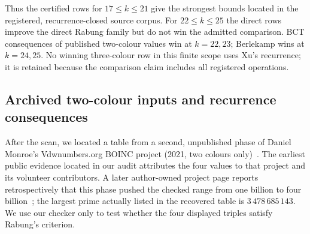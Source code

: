 


Thus the certified rows for $17\le k\le21$ give the strongest bounds located
in the registered, recurrence-closed source corpus. For $22\le k\le25$ the
direct rows improve the direct Rabung family but do not win the admitted
comparison. BCT consequences of published two-colour values win at $k=22,23$;
Berlekamp wins at $k=24,25$. No winning three-colour row in this finite scope
uses Xu's recurrence; it is retained because the comparison claim includes all
registered operations.

\subsection{Archived two-colour inputs and recurrence consequences}\label{ss:r2}

After the scan, we located a table from a second, unpublished phase of Daniel
Monroe's Vdwnumbers.org BOINC project (2021, two colours only)~\cite{MonroePhase2Archive}.
The earliest public evidence located in our audit attributes the four values
to that project and its volunteer contributors. A later author-owned project
page reports retrospectively that this phase pushed the checked range from one
billion to four billion~\cite{MonroePage}; the largest prime actually listed
in the recovered table is $3\,478\,685\,143$. We use our checker only to test
whether the four displayed triples satisfy Rabung's criterion.


